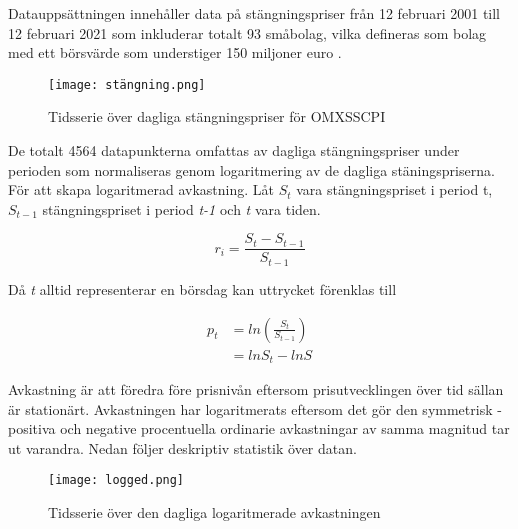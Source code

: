 \documentclass[12pt]{article}
\begin{document}
Datauppsättningen innehåller data på stängningspriser från 12 februari 2001 till 12 februari 2021 som inkluderar totalt 93 småbolag, vilka defineras som bolag med ett börsvärde som understiger 150 miljoner euro \parencite{smabalagsdefinition}. 


\begin{figure}[H]
\caption{Tidsserie över dagliga stängningspriser för OMXSSCPI}
\texttt{[image: stängning.png]}
\centering
\end{figure}

De totalt 4564 datapunkterna omfattas av dagliga stängningspriser under perioden som normaliseras genom logaritmering av de dagliga stäningspriserna. För att skapa  logaritmerad avkastning. Låt \(S_t\) vara stängningspriset i period t, \(S_{t-1}\) stängningspriset i period \emph{t-1} och \emph{t} vara tiden. 

\begin{equation*}
    r_{i} = \frac{S_{t} - S_{t-1}}{S_{t-1}}
\end{equation*}

Då \emph{t} alltid representerar en börsdag kan uttrycket förenklas till

\begin{equation*} \label{eq1}
\begin{split}
p_{t} & = ln(\frac{S_{t}}{S_{t-1}}) \\
 & = lnS_{t} - lnS_{}
\end{split}
\end{equation*}

Avkastning är att föredra före prisnivån eftersom prisutvecklingen över tid sällan är stationärt. Avkastningen har logaritmerats eftersom det gör den symmetrisk - positiva och negative procentuella ordinarie avkastningar av samma magnitud tar ut varandra. Nedan följer deskriptiv statistik över datan.

\begin{figure}[H]
\caption{Tidsserie över den dagliga logaritmerade avkastningen}
\texttt{[image: logged.png]}
\centering
\end{figure}

\begin{table}[H]
\centering
\caption{Deskriptiv statitistik av logaritmerad avkastning}
\label{tab:my-table}
\end{table}
\end{document}
